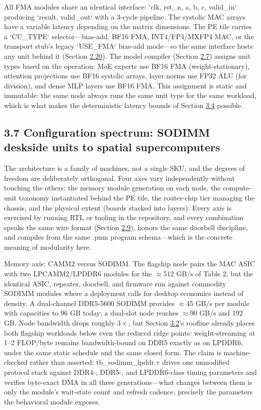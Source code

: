 \documentclass[12pt,onecolumn]{article}
\begin{document}
All FMA modules share an identical interface: `clk, rst\_n, a, b, c, valid\_in` producing `result, valid\_out` with a 3-cycle pipeline. The systolic MAC arrays have a variable latency depending on the matrix dimensions. The PE tile carries a `CU\_TYPE` selector---bias-add, BF16 FMA, INT4/FP4/MXFP4 MAC, or the transport stub's legacy `USE\_FMA` bias-add mode---so the same interface hosts any unit behind it (Section \hyperref[sec:2.20]{2.20}). The model compiler (Section \hyperref[sec:2.7]{2.7}) assigns unit types based on the operation: MoE experts use BF16 FMA (weight-stationary), attention projections use BF16 systolic arrays, layer norms use FP32 ALU (for division), and dense MLP layers use BF16 FMA. This assignment is static and immutable: the same node always runs the same unit type for the same workload, which is what makes the deterministic latency bounds of Section \hyperref[sec:3.4]{3.4} possible.

\subsection*{3.7 Configuration spectrum: SODIMM deskside units to spatial supercomputers}\label{sec:3.7}

The architecture is a family of machines, not a single SKU, and the degrees of freedom are deliberately orthogonal. Four axes vary independently without touching the others: the memory module generation on each node, the compute-unit taxonomy instantiated behind the PE tile, the router-chip tier managing the chassis, and the physical extent (boards stacked into layers). Every axis is exercised by running RTL or tooling in the repository, and every combination speaks the same wire format (Section \hyperref[sec:2.9]{2.9}), honors the same doorbell discipline, and compiles from the same .pnm program schema---which is the concrete meaning of modularity here.

Memory axis: CAMM2 versus SODIMM. The flagship node pairs the MAC ASIC with two LPCAMM2/LPDDR6 modules\cite{16,17} for the $\approx$512 GB/s of Table 2, but the identical ASIC, repeater, doorbell, and firmware run against commodity SODIMM modules\cite{30} where a deployment calls for desktop economics instead of density. A dual-channel DDR5-5600 SODIMM provides $\approx$45 GB/s per module with capacities to 96 GB today; a dual-slot node reaches $\approx$90 GB/s and 192 GB. Node bandwidth drops roughly $3\times$, but Section \hyperref[sec:3.2]{3.2}'s roofline already places both flagship workloads below even the reduced ridge points: weight-streaming at 1--2 FLOP/byte remains bandwidth-bound on DDR5 exactly as on LPDDR6, under the same static schedule and the same closed form. The claim is machine-checked rather than asserted: tb\_sodimm\_lpddr.v drives one unmodified protocol stack against DDR4-, DDR5-, and LPDDR6-class timing parameters and verifies byte-exact DMA in all three generations---what changes between them is only the module's wait-state count and refresh cadence, precisely the parameters the behavioral module exposes.
\end{document}
